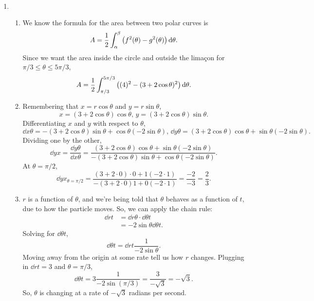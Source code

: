\begin{enumerate}
	\item \begin{enumerate}
		\item We know the formula for the area between two polar curves is
			\begin{equation*}
				A = \frac{1}{2}\int_{\alpha}^{\beta}{\left(f^2(\theta)-g^2(\theta)\right)\mathrm{d} \theta}.
			\end{equation*}
			Since we want the area inside the circle and outside the lima\c{c}on for $\pi/3 \leq \theta \leq 5\pi/3$,
			\begin{equation*}
				A = \frac{1}{2}\int_{\pi/3}^{5\pi/3}{\left((4)^2-(3+2\cos{\theta})^2\right)\mathrm{d} \theta}.
			\end{equation*}
		\item Remembering that $x=r\cos{\theta}$ and $y=r\sin{\theta}$,
			\begin{equation*}
				x = (3+2\cos{\theta})\cos{\theta} \text{, } y = (3+2\cos{\theta})\sin{\theta}.
			\end{equation*}
			Differentiating $x$ and $y$ with respect to $\theta$,
			\begin{equation*}
				\dd{x}{\theta}=-(3+2\cos{\theta})\sin{\theta} + \cos{\theta}(-2\sin{\theta}) \text{, } \dd{y}{\theta} = (3+2\cos{\theta})\cos{\theta} + \sin{\theta}(-2\sin{\theta}).
			\end{equation*}
			Dividing one by the other,
			\begin{equation*}
				\dd{y}{x} = \frac{\dd{y}{\theta}}{\dd{x}{\theta}} = \frac{(3+2\cos{\theta})\cos{\theta} + \sin{\theta}(-2\sin{\theta})}{-(3+2\cos{\theta})\sin{\theta} + \cos{\theta}(-2\sin{\theta})}.
			\end{equation*}
			At $\theta=\pi/2$,
			\begin{equation*}
				\dd{y}{x}_{\theta=\pi/2} = \frac{(3+2\cdot 0)\cdot 0 + 1(-2\cdot 1)}{-(3+2\cdot 0)1 + 0(-2\cdot 1)} = \frac{-2}{-3} = \frac{2}{3}.
			\end{equation*}
		\item $r$ is a function of $\theta$, and we're being told that $\theta$ behaves as a function of $t$, due to how the particle moves.
			So, we can apply the chain rule:
			\begin{align*}
				\dd{r}{t} &= \dd{r}{\theta}\cdot\dd{\theta}{t} \\
				&= -2\sin{\theta}\dd{\theta}{t}.
			\end{align*}
			Solving for $\dd{\theta}{t}$,
			\begin{equation*}
				\dd{\theta}{t} = \dd{r}{t}\frac{1}{-2\sin{\theta}}.
			\end{equation*}
			Moving away from the origin at some rate tell us how $r$ changes.
			Plugging in $\dd{r}{t}=3$ and $\theta=\pi/3$,
			\begin{equation*}
				\dd{\theta}{t} = 3\frac{1}{-2\sin{\left(\pi/3\right)}} = \frac{3}{-\sqrt{3}} = -\sqrt{3}.
			\end{equation*}
			So, $\theta$ is changing at a rate of $-\sqrt{3}$ radians per second.
	\end{enumerate}


\end{enumerate}
